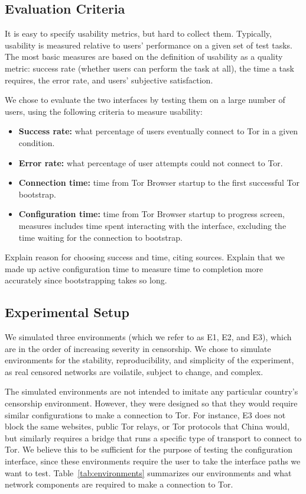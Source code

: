 \documentclass[USenglish,oneside,twocolumn]{article}
\begin{document}
\subsection{Evaluation Criteria}
\label{sec:eval}

{\color {blue}
It is easy to specify usability metrics, but hard to collect them. Typically, usability is measured relative to users' performance on a given set of test tasks. The most basic measures are based on the definition of usability as a quality metric: success rate (whether users can perform the task at all), the time a task requires, the error rate, and users' subjective satisfaction.

We chose to evaluate the two interfaces by testing them on a large number of users, using the following criteria to measure usability: \\
\begin{itemize}
\item {\bfseries Success rate:} what percentage of users eventually connect to Tor in a given condition. 
\item {\bfseries Error rate:} what percentage of user attempts could not connect to Tor. 
\item {\bfseries Connection time:} time from Tor Browser startup to the first successful Tor bootstrap. 
\item {\bfseries Configuration time:} time from Tor Browser startup to progress screen, measures includes time spent interacting with the interface, excluding the time waiting for the connection to bootstrap.
\end{itemize}

Explain reason for choosing success and time, citing sources. Explain that we made up active configuration time to measure time to completion more accurately since bootstrapping takes so long. 
}

\subsection{Experimental Setup}
We simulated three environments (which we refer to as E1, E2, and E3), 
which are in the order of increasing severity in censorship. We chose to 
simulate environments for the stability, reproducibility, and simplicity of the 
experiment, as real censored networks are voilatile, subject to change, and complex. 

The simulated environments are not intended to imitate any particular country's censorship environment. However, they were designed so that they would require similar configurations
to make a connection to Tor. For instance, E3 does not block the same websites, public Tor relays, or Tor protocols that China would, but similarly requires a bridge that runs a specific type of transport to connect to Tor. We believe this to be sufficient for the purpose of testing the configuration interface, since these environments require the user to take the interface paths we want to test. Table~\ref{tab:environments} summarizes our
environments and what network components are required to make a 
connection to Tor. 
\end{document}
